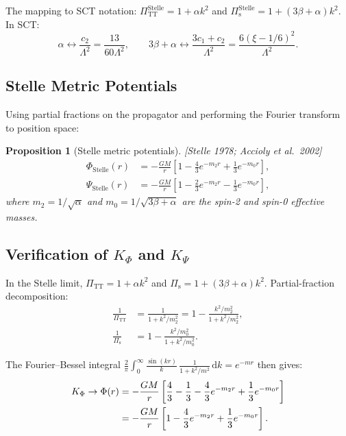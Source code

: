 \documentclass[11pt,a4paper]{article}
\theoremstyle{plain}
\newtheorem{proposition}[theorem]{Proposition}
\theoremstyle{definition}
\theoremstyle{remark}
\renewcommand{\dd}{\mathrm{d}}
\newcommand{\fromlit}[1]{\textcolor{blue!70!black}{\textsf{[#1]}}}
\begin{document}
The mapping to SCT notation: $\Pi_{\mathrm{TT}}^{\mathrm{Stelle}}
= 1 + \alpha k^2$ and $\Pi_{\mathrm{s}}^{\mathrm{Stelle}}
= 1 + (3\beta + \alpha) k^2$.  In SCT:
\begin{equation}
  \alpha \leftrightarrow \frac{c_2}{\Lambda^2} = \frac{13}{60\Lambda^2},
  \qquad
  3\beta + \alpha \leftrightarrow \frac{3c_1 + c_2}{\Lambda^2}
  = \frac{6(\xi - 1/6)^2}{\Lambda^2}.
\end{equation}

\subsection{Stelle Metric Potentials}

Using partial fractions on the propagator and performing the Fourier
transform to position space:

\begin{proposition}[Stelle metric potentials]\label{prop:stelle-pots}
\fromlit{Stelle 1978; Accioly et al.\ 2002}
\begin{align}
  \Phi_{\mathrm{Stelle}}(r)
  &= -\frac{GM}{r}\left[
    1 - \frac{4}{3}e^{-m_2 r} + \frac{1}{3}e^{-m_0 r}
  \right],
  \label{eq:Phi-Stelle}\\
  \Psi_{\mathrm{Stelle}}(r)
  &= -\frac{GM}{r}\left[
    1 - \frac{2}{3}e^{-m_2 r} - \frac{1}{3}e^{-m_0 r}
  \right],
  \label{eq:Psi-Stelle}
\end{align}
where $m_2 = 1/\sqrt{\alpha}$ and $m_0 = 1/\sqrt{3\beta + \alpha}$
are the spin-2 and spin-0 effective masses.
\end{proposition}

\subsection{Verification of $K_\Phi$ and $K_\Psi$}

In the Stelle limit, $\Pi_{\mathrm{TT}} = 1 + \alpha k^2$
and $\Pi_{\mathrm{s}} = 1 + (3\beta + \alpha)k^2$.  Partial-fraction
decomposition:
\begin{align}
  \frac{1}{\Pi_{\mathrm{TT}}}
  &= \frac{1}{1 + k^2/m_2^2}
  = 1 - \frac{k^2/m_2^2}{1 + k^2/m_2^2},\\
  \frac{1}{\Pi_{\mathrm{s}}}
  &= 1 - \frac{k^2/m_0^2}{1 + k^2/m_0^2}.
\end{align}

The Fourier--Bessel integral $\frac{2}{\pi}\int_0^\infty
\frac{\sin(kr)}{k}\,\frac{1}{1+k^2/m^2}\,\dd k = e^{-mr}$
then gives:
\begin{align}
  K_\Phi \to \Phi(r)
  &= -\frac{GM}{r}\left[\frac{4}{3} - \frac{1}{3}
    - \frac{4}{3}e^{-m_2 r} + \frac{1}{3}e^{-m_0 r}\right]\notag\\
  &= -\frac{GM}{r}\left[1 - \frac{4}{3}e^{-m_2 r}
    + \frac{1}{3}e^{-m_0 r}\right].
\end{align}
\end{document}
